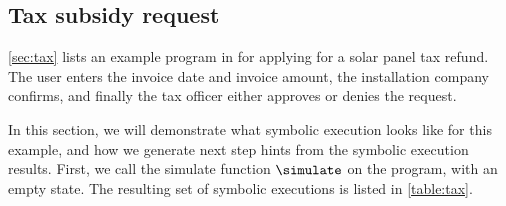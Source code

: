 \subsection{Tax subsidy request}
\label{sub:assistive-tax}

\cref{sec:tax} lists an example program in \TOPHAT for applying for a solar panel tax refund.
The user enters the invoice date and invoice amount, the installation company confirms, and finally the tax officer either approves or denies the request.

In this section, we will demonstrate what symbolic execution looks like for this example, and how we generate next step hints from the symbolic execution results.
First, we call the simulate function $\simulate$ on the program, with an empty state.
The resulting set of symbolic executions is listed in \cref{table:tax}.

